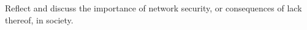 \item Reflect and discuss the importance of network security, or consequences 
of lack thereof, in society.
